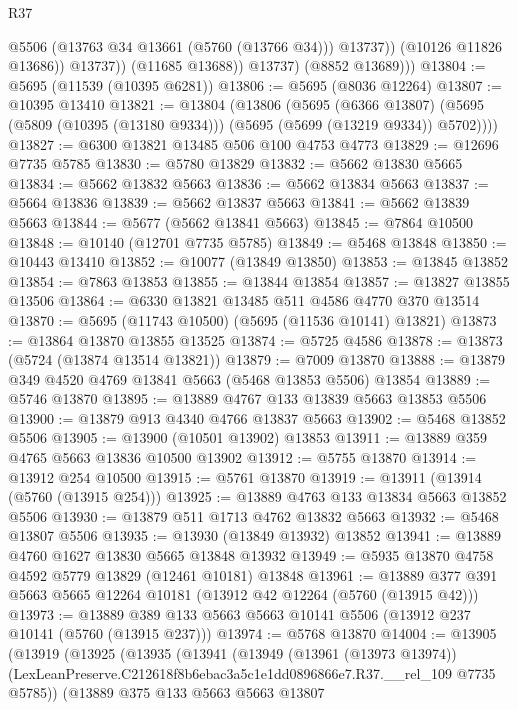 \begin{lexlean}{R37}
\begin{coremodule}
                      @5506
                      (@13763 @34 @13661 (@5760 (@13766 @34)))
                      @13737))
                  (@10126 @11826 @13686))
                @13737))
            (@11685 @13688))
          @13737)
        (@8852 @13689)))
@13804 := @5695 (@11539 (@10395 @6281))
@13806 := @5695 (@8036 @12264)
@13807 := @10395 @13410
@13821 := @13804
    (@13806
      (@5695
        (@6366 @13807)
        (@5695 (@5809 (@10395 (@13180 @9334))) (@5695 (@5699 (@13219 @9334)) @5702))))
@13827 := @6300 @13821 @13485 @506 @100 @4753 @4773
@13829 := @12696 @7735 @5785
@13830 := @5780 @13829
@13832 := @5662 @13830 @5665
@13834 := @5662 @13832 @5663
@13836 := @5662 @13834 @5663
@13837 := @5664 @13836
@13839 := @5662 @13837 @5663
@13841 := @5662 @13839 @5663
@13844 := @5677 (@5662 @13841 @5663)
@13845 := @7864 @10500
@13848 := @10140 (@12701 @7735 @5785)
@13849 := @5468 @13848
@13850 := @10443 @13410
@13852 := @10077 (@13849 @13850)
@13853 := @13845 @13852
@13854 := @7863 @13853
@13855 := @13844 @13854
@13857 := @13827 @13855 @13506
@13864 := @6330 @13821 @13485 @511 @4586 @4770 @370 @13514
@13870 := @5695 (@11743 @10500) (@5695 (@11536 @10141) @13821)
@13873 := @13864 @13870 @13855 @13525
@13874 := @5725 @4586
@13878 := @13873 (@5724 (@13874 @13514 @13821))
@13879 := @7009 @13870
@13888 := @13879 @349 @4520 @4769 @13841 @5663 (@5468 @13853 @5506) @13854
@13889 := @5746 @13870
@13895 := @13889 @4767 @133 @13839 @5663 @13853 @5506
@13900 := @13879 @913 @4340 @4766 @13837 @5663
@13902 := @5468 @13852 @5506
@13905 := @13900 (@10501 @13902) @13853
@13911 := @13889 @359 @4765 @5663 @13836 @10500 @13902
@13912 := @5755 @13870
@13914 := @13912 @254 @10500
@13915 := @5761 @13870
@13919 := @13911 (@13914 (@5760 (@13915 @254)))
@13925 := @13889 @4763 @133 @13834 @5663 @13852 @5506
@13930 := @13879 @511 @1713 @4762 @13832 @5663
@13932 := @5468 @13807 @5506
@13935 := @13930 (@13849 @13932) @13852
@13941 := @13889 @4760 @1627 @13830 @5665 @13848 @13932
@13949 := @5935 @13870 @4758 @4592 @5779 @13829 (@12461 @10181) @13848
@13961 := @13889 @377 @391 @5663 @5665 @12264 @10181 (@13912 @42 @12264 (@5760 (@13915 @42)))
@13973 := @13889 @389 @133 @5663 @5663 @10141 @5506 (@13912 @237 @10141 (@5760 (@13915 @237)))
@13974 := @5768 @13870
@14004 := @13905
    (@13919
      (@13925
        (@13935
          (@13941
            (@13949
              (@13961 (@13973 @13974))
              (LexLeanPreserve.C212618f8b6ebac3a5c1e1dd0896866e7.R37.__rel_109 @7735 @5785))
            (@13889
              @375
              @133
              @5663
              @5663
              @13807

\end{coremodule}
\end{lexlean}
